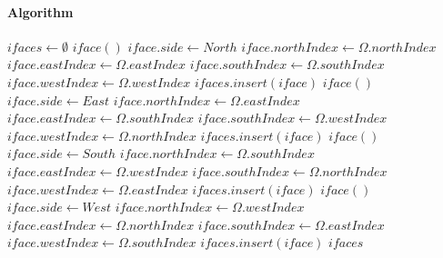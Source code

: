 \documentclass[12pt]{article}
\begin{document}
\paragraph{Algorithm}

\begin{algorithm}[H]
\caption{}
\begin{algorithmic}[1]
    \State $ifaces \gets \emptyset$ 
            \State $iface()$ 
            \State $iface.side \gets North$
            \State $iface.northIndex \gets \Omega.northIndex$
            \State $iface.eastIndex \gets \Omega.eastIndex$
            \State $iface.southIndex \gets \Omega.southIndex$
            \State $iface.westIndex \gets \Omega.westIndex$
            \State $ifaces.insert(iface)$
        \EndIf
            \State $iface()$ 
            \State $iface.side \gets East$
            \State $iface.northIndex \gets \Omega.eastIndex$
            \State $iface.eastIndex \gets \Omega.southIndex$
            \State $iface.southIndex \gets \Omega.westIndex$
            \State $iface.westIndex \gets \Omega.northIndex$
            \State $ifaces.insert(iface)$
        \EndIf
            \State $iface()$ 
            \State $iface.side \gets South$
            \State $iface.northIndex \gets \Omega.southIndex$
            \State $iface.eastIndex \gets \Omega.westIndex$
            \State $iface.southIndex \gets \Omega.northIndex$
            \State $iface.westIndex \gets \Omega.eastIndex$
            \State $ifaces.insert(iface)$
        \EndIf
            \State $iface()$ 
            \State $iface.side \gets West$
            \State $iface.northIndex \gets \Omega.westIndex$
            \State $iface.eastIndex \gets \Omega.northIndex$
            \State $iface.southIndex \gets \Omega.eastIndex$
            \State $iface.westIndex \gets \Omega.southIndex$
            \State $ifaces.insert(iface)$
        \EndIf
    \EndFor
    \State \Return $ifaces$
    \EndProcedure
\end{algorithmic}
\end{algorithm}
\end{document}
